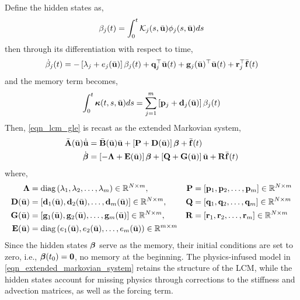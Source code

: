 Define the hidden states as,
\begin{equation}
    \beta_j(t) = \int_{0}^{t}\mathcal{K}_j(s,\bar{\mathbf{u}})\phi_j(s,\bar{\mathbf{u}})ds
\end{equation}
then through its differentiation with respect to time,
\begin{equation}
    \dot{\beta}_j(t) = -\left[\lambda_j + e_j(\bar{\mathbf{u}})\right]\beta_j(t) + \mathbf{q}_j^{\top}\bar{\mathbf{u}}(t) + \mathbf{g}_j(\bar{\mathbf{u}})^{\top}\bar{\mathbf{u}}(t) + \mathbf{r}_j^{\top}\bar{\mathbf{f}}(t)
\end{equation}
and the memory term becomes,
\begin{equation}
    \int_{0}^{t}\boldsymbol{\kappa}(t,s,\bar{\mathbf{u}})ds = \sum_{j=1}^{m}\left[\mathbf{p}_j + \mathbf{d}_j(\bar{\mathbf{u}})\right]\beta_j(t)
\end{equation}
Then, \cref{eqn_lcm_gle} is recast as the extended Markovian system,
\begin{subequations}
    \begin{align}
        \bar{\mathbf{A}}(\bar{\mathbf{u}})\dot{\bar{\mathbf{u}}} &= \bar{\mathbf{B}}(\bar{\mathbf{u}})\bar{\mathbf{u}} + \left[\mathbf{P} + \mathbf{D}(\bar{\mathbf{u}})\right]\boldsymbol{\beta} + \bar{\mathbf{f}}(t)\\
        \dot{\boldsymbol{\beta}} &= \left[-\boldsymbol{\Lambda} + \mathbf{E}(\bar{\mathbf{u}})\right]\boldsymbol{\beta} + \left[\mathbf{Q} + \mathbf{G}(\bar{\mathbf{u}})\right]\bar{\mathbf{u}} + \mathbf{R}\bar{\mathbf{f}}(t)
    \end{align}\label{eqn_extended_markovian_system}
\end{subequations}
where,
\begin{subequations}
    \begin{align}
        \boldsymbol{\Lambda} &= \text{diag}\left(\lambda_1,\lambda_2,\dots,\lambda_m\right)\in\mathbb{R}^{N\times m},\quad & \mathbf{P} &= \left[\mathbf{p}_1,\mathbf{p}_2,\dots,\mathbf{p}_m\right]\in\mathbb{R}^{N\times m}\\
        \mathbf{D}(\bar{\mathbf{u}}) &= \left[\mathbf{d}_1(\bar{\mathbf{u}}),\mathbf{d}_2(\bar{\mathbf{u}}),\dots,\mathbf{d}_m(\bar{\mathbf{u}})\right]\in\mathbb{R}^{N\times m},\quad & \mathbf{Q} &= \left[\mathbf{q}_1,\mathbf{q}_2,\dots,\mathbf{q}_m\right]\in\mathbb{R}^{N\times m}\\
        \mathbf{G}(\bar{\mathbf{u}}) &= \left[\mathbf{g}_1(\bar{\mathbf{u}}),\mathbf{g}_2(\bar{\mathbf{u}}),\dots,\mathbf{g}_m(\bar{\mathbf{u}})\right]\in\mathbb{R}^{N\times m},\quad & \mathbf{R} &= \left[\mathbf{r}_1,\mathbf{r}_2,\dots,\mathbf{r}_m\right]\in\mathbb{R}^{N\times m}\\
        \mathbf{E}(\bar{\mathbf{u}}) &= \text{diag}\left(e_1(\bar{\mathbf{u}}),e_2(\bar{\mathbf{u}}),\dots,e_m(\bar{\mathbf{u}})\right)\in\mathbb{R}^{m\times m}&&
    \end{align}
\end{subequations}
Since the hidden states $\boldsymbol{\beta}$ serve as the memory, their initial conditions are set to zero, i.e., $\boldsymbol{\beta}(t_0) = \boldsymbol{0}$, no memory at the beginning. The physics-infused model in \cref{eqn_extended_markovian_system} retains the structure of the LCM, while the hidden states account for missing physics through corrections to the stiffness and advection matrices, as well as the forcing term.

